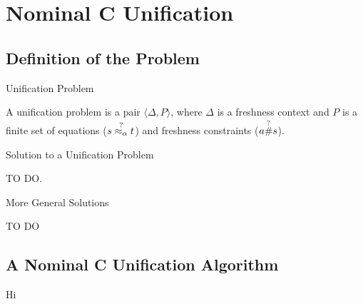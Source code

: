 \section{Nominal C Unification}
\subsection{Definition of the Problem}
\begin{frame}{Unification Problem}
    \begin{definition} 
        A unification problem is a pair $\langle \Delta, P \rangle$, where $\Delta$ is 
        a freshness context and $P$ is a finite set of equations ($s \overset{?}{\mathrel{\approx_\alpha}} t$) and freshness
        constraints ($a \overset{?}{\#} s$).
    \end{definition}
\end{frame}

\begin{frame}{Solution to a Unification Problem} 
    \begin{definition}
        TO DO.
    \end{definition}
\end{frame}

\begin{frame}{More General Solutions}
    \begin{definition}
        TO DO 
    \end{definition}
\end{frame}

\subsection{A Nominal C Unification Algorithm}

\begin{frame}
    Hi
\end{frame}

